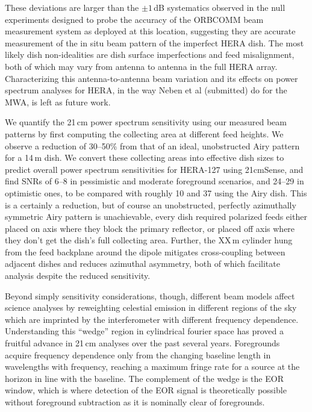 \documentclass[preprint]{aastex}
\begin{document}
These deviations are larger than the $\pm1$\,dB systematics observed in the null experiments designed to probe the accuracy of the ORBCOMM beam measurement system as deployed at this location, suggesting they are accurate measurement of the in situ beam pattern of the imperfect HERA dish. The most likely dish non-idealities are dish surface imperfections and feed misalignment, both of which may vary from antenna to antenna in the full HERA array. Characterizing this antenna-to-antenna beam variation and its effects on power spectrum analyses for HERA, in the way Neben et al (submitted) do for the MWA, is left as future work.

We quantify the 21\,cm power spectrum sensitivity using our measured beam patterns by first computing the collecting area at different feed heights. We observe a reduction of 30--50\% from that of an ideal, unobstructed Airy pattern for a 14\,m dish. We convert these collecting areas into effective dish sizes to predict overall power spectrum sensitivities for HERA-127 using 21cmSense, and find SNRs of 6--8 in pessimistic and moderate foreground scenarios, and 24--29 in optimistic ones, to be compared with roughly 10 and 37 using the Airy dish. This is a certainly a reduction, but of course an unobstructed, perfectly azimuthally symmetric Airy pattern is unachievable, every dish required polarized feeds either placed on axis where they block the primary reflector, or placed off axis where they don't get the dish's full collecting area. Further, the XX\,m cylinder hung from the feed backplane around the dipole mitigates cross-coupling between adjacent dishes and reduces azimuthal asymmetry, both of which facilitate analysis despite the reduced sensitivity.

Beyond simply sensitivity considerations, though, different beam models affect science analyses by reweighting celestial emission in different regions of the sky which are imprinted by the interferometer with different frequency dependence.  Understanding this ``wedge'' region in cylindrical fourier space has proved a fruitful advance in 21\,cm analyses over the past several years. Foregrounds acquire frequency dependence only from the changing baseline length in wavelengths with frequency, reaching a maximum fringe rate for a source at the horizon in line with the baseline. The complement of the wedge is the EOR window, which is where detection of the EOR signal is theoretically possible without foreground subtraction as it is nominally clear of foregrounds. 
\end{document}
